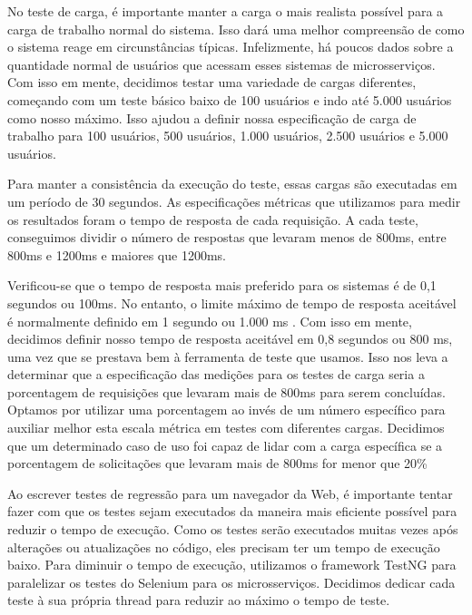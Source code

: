 \begin{tabela}[h]
\begin{tabela}[!t]
\begin{tabela}[h]
\begin{tabela}[h]
\begin{itemizar}
\end{itemizar}

No teste de carga, é importante manter a carga o mais realista possível para a carga de trabalho normal do sistema. Isso dará uma melhor compreensão de como o sistema reage em circunstâncias típicas. Infelizmente, há poucos dados sobre a quantidade normal de usuários que acessam esses sistemas de microsserviços. Com isso em mente, decidimos testar uma variedade de cargas diferentes, começando com um teste básico baixo de 100 usuários e indo até 5.000 usuários como nosso máximo. Isso ajudou a definir nossa especificação de carga de trabalho para 100 usuários, 500 usuários, 1.000 usuários, 2.500 usuários e 5.000 usuários.

Para manter a consistência da execução do teste, essas cargas são executadas em um período de 30 segundos. As especificações métricas que utilizamos para medir os resultados foram o tempo de resposta de cada requisição. A cada teste, conseguimos dividir o número de respostas que levaram menos de 800ms, entre 800ms e 1200ms e maiores que 1200ms.

Verificou-se que o tempo de resposta mais preferido para os sistemas é de 0,1 segundos ou 100ms. No entanto, o limite máximo de tempo de resposta aceitável é normalmente definido em 1 segundo ou 1.000 ms \cite{hamilton2023response}. Com isso em mente, decidimos definir nosso tempo de resposta aceitável em 0,8 segundos ou 800 ms, uma vez que se prestava bem à ferramenta de teste que usamos. Isso nos leva a determinar que a especificação das medições para os testes de carga seria a porcentagem de requisições que levaram mais de 800ms para serem concluídas. Optamos por utilizar uma porcentagem ao invés de um número específico para auxiliar melhor esta escala métrica em testes com diferentes cargas. Decidimos que um determinado caso de uso foi capaz de lidar com a carga específica se a porcentagem de solicitações que levaram mais de 800ms for menor que 20\%


Ao escrever testes de regressão para um navegador da Web, é importante tentar fazer com que os testes sejam executados da maneira mais eficiente possível para reduzir o tempo de execução. Como os testes serão executados muitas vezes após alterações ou atualizações no código, eles precisam ter um tempo de execução baixo. Para diminuir o tempo de execução, utilizamos o framework TestNG para paralelizar os testes do Selenium para os microsserviços. Decidimos dedicar cada teste à sua própria thread para reduzir ao máximo o tempo de teste.


\end{tabela}
\end{tabela}
\end{tabela}
\end{tabela}
